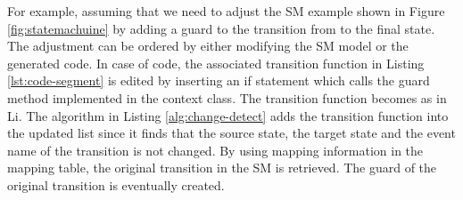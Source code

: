   
For example, assuming that we need to adjust the SM example shown in Figure \ref{fig:statemachuine}  by adding a guard to the transition from  to the final state. The adjustment can be ordered by either modifying the SM model or the generated code. In case of code, the associated transition function in Listing \ref{lst:code-segment} is edited by inserting an if statement which calls the guard method implemented in the context class. The transition function becomes as in Li. The algorithm in Listing \ref{alg:change-detect} adds the transition function into the updated list since it finds that the source state, the target state and the event name of the transition is not changed. By using mapping information in the mapping table, the original transition in the SM is retrieved. The guard of the original transition is eventually created. 	





